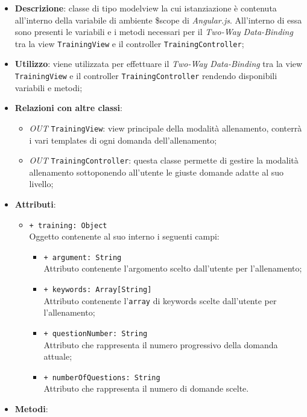 	\begin{itemize}
		\item \textbf{Descrizione}: classe di tipo modelview la cui istanziazione è contenuta all'interno della variabile di ambiente \$scope di \textit{Angular.js}. All'interno di essa sono presenti le variabili e i metodi necessari per il \textit{Two-Way Data-Binding} tra la view \texttt{TrainingView} e il controller \texttt{TrainingController};
		\item \textbf{Utilizzo}: viene utilizzata per effettuare il \textit{Two-Way Data-Binding} tra la view \texttt{TrainingView} e il controller \texttt{TrainingController} rendendo disponibili variabili e metodi;
		\item \textbf{Relazioni con altre classi}: 
		\begin{itemize}
			\item \textit{OUT} \texttt{TrainingView}: view principale della modalità allenamento, conterrà i vari templates di ogni domanda dell'allenamento; 
			\item \textit{OUT} \texttt{TrainingController}: questa classe permette di gestire la modalità allenamento sottoponendo all'utente le giuste domande adatte al suo livello;
		\end{itemize}
		\item \textbf{Attributi}: 
		\begin{itemize}
			\item \texttt{+ training: Object} \\ Oggetto contenente al suo interno i seguenti campi:
			\begin{itemize}
				\item \texttt{+ argument: String} \\ Attributo contenente l'argomento scelto dall'utente per l'allenamento;
				\item \texttt{+ keywords: Array[String]} \\ Attributo contenente l'\texttt{array} di keywords scelte dall'utente per l'allenamento;
				\item \texttt{+ questionNumber: String} \\ Attributo che rappresenta il numero progressivo della domanda attuale;
				\item \texttt{+ numberOfQuestions: String} \\ Attributo che rappresenta il numero di domande scelte.
			\end{itemize}
		\end{itemize}
		\item \textbf{Metodi}: 

\end{itemize}
